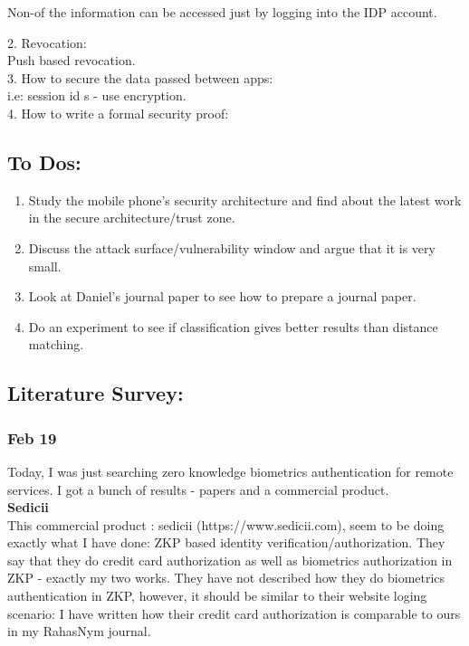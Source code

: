 \documentclass[11pt]{article}
\begin{document}
Non-of the information can be accessed just by logging into the IDP account.

2. Revocation:\\
Push based revocation.\\

3. How to secure the data passed between apps:\\
i.e: session id s - use encryption.\\

4. How to write a formal security proof:\\


\pagebreak
\subsection*{To Dos:}
\begin{enumerate}
 \item Study the mobile phone's security architecture and find about the latest work in the secure architecture/trust zone.
 \item Discuss the attack surface/vulnerability window and argue that it is very small.
 \item Look at Daniel's journal paper to see how to prepare a journal paper.
 \item Do an experiment to see if classification gives better results than distance matching.
\end{enumerate}

\subsection*{Literature Survey:}
\subsubsection*{Feb 19}
Today, I was just searching zero knowledge biometrics authentication for remote services. I got a bunch of results - papers and a commercial
product.\\
\textbf{Sedicii}\\
This commercial product : sedicii (https://www.sedicii.com), seem to be doing exactly what I have done: ZKP based identity verification/authorization.
They say that they do credit card authorization as well as biometrics authorization in ZKP - exactly my two works.
They have not described how they do biometrics authentication in ZKP, however, it should be similar to their website loging scenario:
I have written how their credit card authorization is comparable to ours in my RahasNym journal.
\pagebreak
\end{document}
